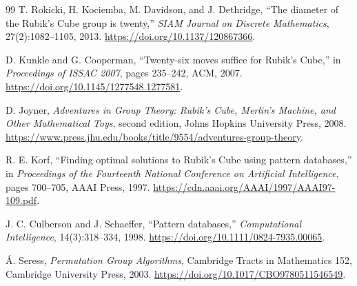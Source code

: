 \documentclass[11pt]{article}
\theoremstyle{definition}
\begin{document}
\begin{thebibliography}{99}
T. Rokicki, H. Kociemba, M. Davidson, and J. Dethridge,
\newblock ``The diameter of the Rubik's Cube group is twenty,''
\newblock \emph{SIAM Journal on Discrete Mathematics}, 27(2):1082--1105, 2013.
\newblock \url{https://doi.org/10.1137/120867366}.

D. Kunkle and G. Cooperman,
\newblock ``Twenty-six moves suffice for Rubik's Cube,''
\newblock in \emph{Proceedings of ISSAC 2007}, pages 235--242, ACM, 2007.
\newblock \url{https://doi.org/10.1145/1277548.1277581}.

D. Joyner,
\newblock \emph{Adventures in Group Theory: Rubik's Cube, Merlin's Machine, and Other Mathematical Toys},
\newblock second edition, Johns Hopkins University Press, 2008.
\newblock \url{https://www.press.jhu.edu/books/title/9554/adventures-group-theory}.

R. E. Korf,
\newblock ``Finding optimal solutions to Rubik's Cube using pattern databases,''
\newblock in \emph{Proceedings of the Fourteenth National Conference on Artificial Intelligence}, pages 700--705, AAAI Press, 1997.
\newblock \url{https://cdn.aaai.org/AAAI/1997/AAAI97-109.pdf}.

J. C. Culberson and J. Schaeffer,
\newblock ``Pattern databases,''
\newblock \emph{Computational Intelligence}, 14(3):318--334, 1998.
\newblock \url{https://doi.org/10.1111/0824-7935.00065}.

\'{A}. Seress,
\newblock \emph{Permutation Group Algorithms},
\newblock Cambridge Tracts in Mathematics 152, Cambridge University Press, 2003.
\newblock \url{https://doi.org/10.1017/CBO9780511546549}.

\end{thebibliography}
\end{document}

